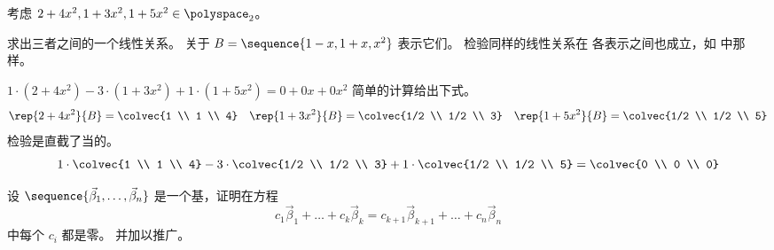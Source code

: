 \begin{exercises}
\begin{answer}
    \end{answer}
  \recommended \item 考虑 \( 2+4x^2, 1+3x^2, 1+5x^2 \in\polyspace_2\)。
    \begin{exparts}
      \partsitem 求出三者之间的一个线性关系。
      \partsitem 关于
        $B=\sequence{1-x,1+x,x^2}$ 表示它们。
      \partsitem 检验同样的线性关系在
        各表示之间也成立，如
         中那样。
    \end{exparts}
    \begin{answer}
    \begin{exparts}
      \partsitem $1\cdot(2+4x^2)-3\cdot(1+3x^2)+1\cdot(1+5x^2)=0+0x+0x^2$
      \partsitem 简单的计算给出下式。
        \begin{equation*}
          \rep{2+4x^2}{B}=\colvec{1 \\ 1 \\ 4}
          \quad
          \rep{1+3x^2}{B}=\colvec{1/2 \\ 1/2 \\ 3}
          \quad
          \rep{1+5x^2}{B}=\colvec{1/2 \\ 1/2 \\ 5}
        \end{equation*}
      \partsitem 检验是直截了当的。
        \begin{equation*}
          1\cdot\colvec{1 \\ 1 \\ 4}
          -3\cdot\colvec{1/2 \\ 1/2 \\ 3}
          +1\cdot\colvec{1/2 \\ 1/2 \\ 5}
          =\colvec{0 \\ 0 \\ 0}
        \end{equation*}
    \end{exparts}
    \end{answer}
  \recommended \item
    设
    \( \sequence{\vec{\beta}_1,\dots,\vec{\beta}_n } \)
    是一个基，证明在方程
    \begin{equation*}
       c_1\vec{\beta}_1+\dots+c_k\vec{\beta}_k
       =
       c_{k+1}\vec{\beta}_{k+1}+\dots+c_n\vec{\beta}_n
    \end{equation*}
    中每个 \( c_i \) 都是零。
    并加以推广。
\end{exercises}

